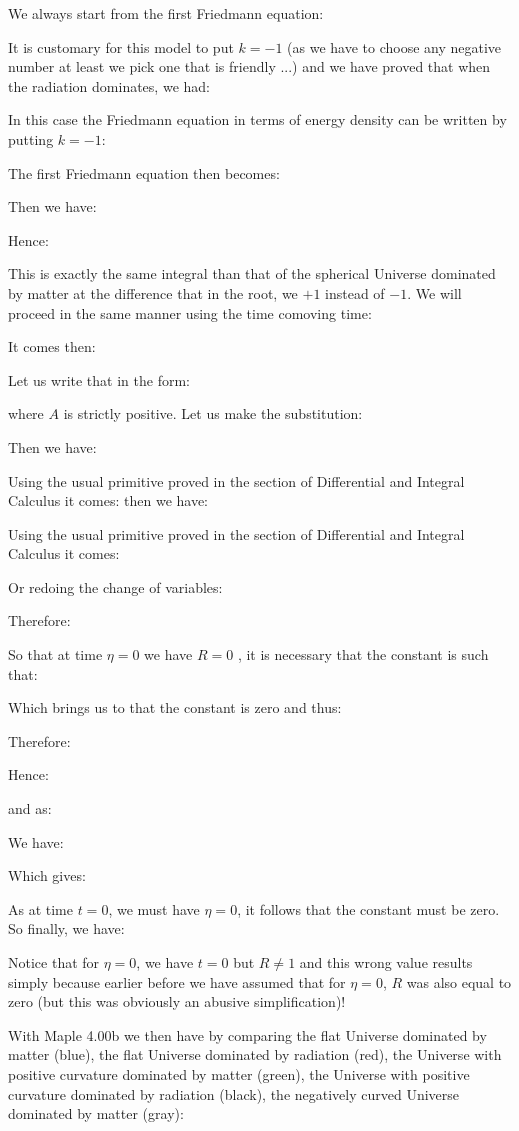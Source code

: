 	We always start from the first Friedmann equation:
	
	It is customary for this model to put $k=-1$ (as we have to choose any negative number at least we pick one that is friendly ...) and we have proved that when the radiation dominates, we had:
	
	In this case the Friedmann equation in terms of energy density can be written by putting $k=-1$:
	
	The first Friedmann equation then becomes:
	
	Then we have:
	
	Hence:
	
	This is exactly the same integral than that of the spherical Universe dominated by matter at the difference that in the root, we $+1$ instead of $-1$. We will proceed in the same manner using the time comoving time:
	
	It comes then:
	
	Let us write that in the form:
	
	where $A$ is strictly positive. Let us make the substitution:
	
	Then we have:
	
	Using the usual primitive proved in the section of Differential and Integral Calculus it comes:
	then we have:
	
	Using the usual primitive proved in the section of Differential and Integral Calculus it comes:
	
	Or redoing the change of variables:
	
	Therefore:
	
	So that at time $\eta=0$ we have $R=0$ , it is necessary that the constant is such that:
	
	Which brings us to that the constant is zero and thus:
	
	Therefore:
	
	Hence:
	
	and as:
	
	We have:
	
	Which gives:
	
	As at time $t=0$, we must have $\eta=0$, it follows that the constant must be zero. So finally, we have:
	
	\begin{tcolorbox}[title=Remark,colframe=black,arc=10pt]
	Notice that for $\eta=0$, we have $t=0$ but $R\neq 1$ and this wrong value results simply because earlier before we have assumed that for $\eta=0$, $R$ was also equal to zero (but this was obviously an abusive simplification)!
	\end{tcolorbox}
	With Maple 4.00b we then have by comparing the flat Universe dominated by matter (blue), the flat Universe dominated by radiation (red), the Universe with positive curvature dominated by matter (green), the Universe with positive curvature dominated by radiation (black), the negatively curved Universe dominated by matter (gray):
	

